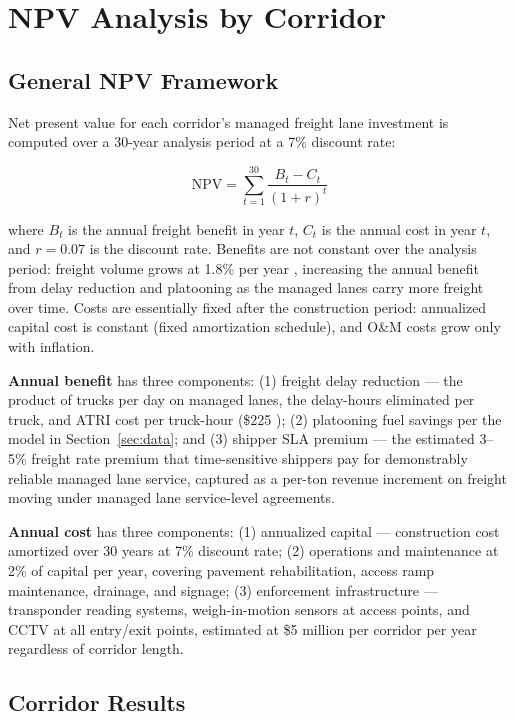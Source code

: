 \section{NPV Analysis by Corridor}
\label{sec:npv}

\subsection{General NPV Framework}

Net present value for each corridor's managed freight lane investment is computed over a 30-year analysis period at a 7\% discount rate:

\begin{equation}
\text{NPV} = \sum_{t=1}^{30} \frac{B_t - C_t}{(1+r)^t}
\label{eq:npv}
\end{equation}

where $B_t$ is the annual freight benefit in year $t$, $C_t$ is the annual cost in year $t$, and $r = 0.07$ is the discount rate. Benefits are not constant over the analysis period: freight volume grows at 1.8\% per year \citep{FHWA_freight2023}, increasing the annual benefit from delay reduction and platooning as the managed lanes carry more freight over time. Costs are essentially fixed after the construction period: annualized capital cost is constant (fixed amortization schedule), and O\&M costs grow only with inflation.

\textbf{Annual benefit} has three components: (1) freight delay reduction --- the product of trucks per day on managed lanes, the delay-hours eliminated per truck, and ATRI cost per truck-hour (\$225 \citep{ATRI_costs2024}); (2) platooning fuel savings per the model in Section~\ref{sec:data}; and (3) shipper SLA premium --- the estimated 3--5\% freight rate premium that time-sensitive shippers pay for demonstrably reliable managed lane service, captured as a per-ton revenue increment on freight moving under managed lane service-level agreements.

\textbf{Annual cost} has three components: (1) annualized capital --- construction cost amortized over 30 years at 7\% discount rate; (2) operations and maintenance at 2\% of capital per year, covering pavement rehabilitation, access ramp maintenance, drainage, and signage; (3) enforcement infrastructure --- transponder reading systems, weigh-in-motion sensors at access points, and CCTV at all entry/exit points, estimated at \$5 million per corridor per year regardless of corridor length.

\subsection{Corridor Results}

